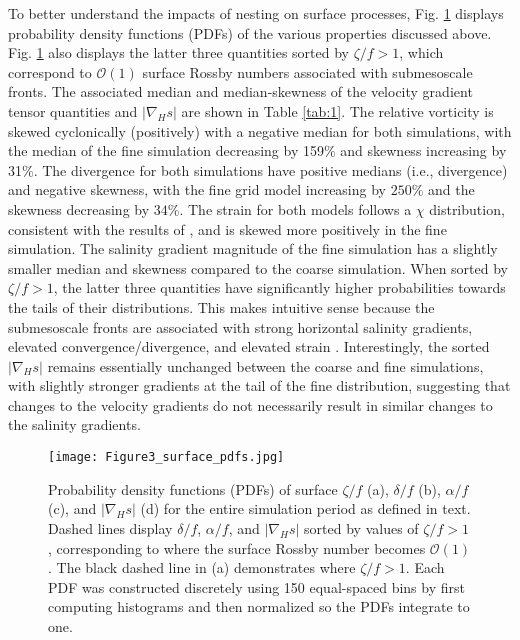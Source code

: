 \documentclass[draft]{agujournal2019}
\begin{document}
To better understand the impacts of nesting on surface processes, Fig. \ref{fig:surface_pdfs} displays probability density functions (PDFs) of the various properties discussed above. Fig. \ref{fig:surface_pdfs} also displays the latter three quantities sorted by $\zeta/f>1$, which correspond to $\mathcal{O}(1)$ surface Rossby numbers associated with submesoscale fronts. The associated median and median-skewness of the velocity gradient tensor quantities and $|\nabla_H s|$ are shown in Table \ref{tab:1}. The relative vorticity is skewed cyclonically (positively) with a negative median for both simulations, with the median of the fine simulation decreasing by 159$\%$ and skewness increasing by 31$\%$. The divergence for both simulations have positive medians (i.e., divergence) and negative skewness, with the fine grid model increasing by $250 \%$ and the skewness decreasing by $34\%$.  The strain for both models follows a $\chi$ distribution, consistent with the results of , and is skewed more positively in the fine simulation. The salinity gradient magnitude of the fine simulation has a slightly smaller median and skewness compared to the coarse simulation. When sorted by $\zeta/f>1$, the latter three quantities have significantly higher probabilities towards the tails of their distributions. This makes intuitive sense because the submesoscale fronts are associated with strong horizontal salinity gradients, elevated convergence/divergence, and elevated strain \cite{McWilliams_2016}. Interestingly, the sorted $|\nabla_H s|$ remains essentially unchanged between the coarse and fine simulations, with slightly stronger gradients at the tail of the fine distribution, suggesting that changes to the velocity gradients do not necessarily result in similar changes to the salinity gradients.

\begin{figure}[ht] 
 \centerline{\texttt{[image: Figure3\_surface\_pdfs.jpg]}}
  \caption{Probability density functions (PDFs) of surface $\zeta/f$ (a), $\delta/f$ (b), $\alpha/f$ (c), and $|\nabla_H s|$ (d) for the entire simulation period as defined in text. Dashed lines display $\delta/f$, $\alpha/f$, and $|\nabla_H s|$ sorted by values of $\zeta/f>1$, corresponding to where the surface Rossby number becomes $\mathcal{O}(1)$. The black dashed line in (a) demonstrates where $\zeta/f>1$. Each PDF was constructed discretely using 150 equal-spaced bins by first computing histograms and then normalized so the PDFs integrate to one.}
  \label{fig:surface_pdfs}
\end{figure}
\end{document}
